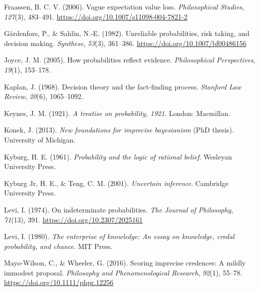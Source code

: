 \documentclass[
  10pt,
  dvipsnames,enabledeprecatedfontcommands]{scrartcl}
\newlength{\cslhangindent}
\newlength{\cslentryspacingunit} %
\newenvironment{CSLReferences}[2] %
 {%
  \setlength{\parindent}{0pt}
  \ifodd #1
  \let\oldpar\par
  \def\par{\hangindent=\cslhangindent\oldpar}
  \fi
  \setlength{\parskip}{#2\cslentryspacingunit}
 }%
 {}
\begin{document}
\begin{CSLReferences}{1}{0}
\leavevmode{}%
Fraassen, B. C. V. (2006). Vague expectation value loss.
\emph{Philosophical Studies}, \emph{127}(3), 483--491.
\url{https://doi.org/10.1007/s11098-004-7821-2}

\leavevmode{}%
Gärdenfors, P., \& Sahlin, N.-E. (1982). Unreliable probabilities, risk
taking, and decision making. \emph{Synthese}, \emph{53}(3), 361--386.
\url{https://doi.org/10.1007/bf00486156}

\leavevmode{}%
Joyce, J. M. (2005). How probabilities reflect evidence.
\emph{Philosophical Perspectives}, \emph{19}(1), 153--178.

\leavevmode{}%
Kaplan, J. (1968). Decision theory and the fact-finding process.
\emph{Stanford Law Review}, \emph{20}(6), 1065--1092.

\leavevmode{}%
Keynes, J. M. (1921). \emph{A treatise on probability, 1921}. London:
Macmillan.

\leavevmode{}%
Konek, J. (2013). \emph{New foundations for imprecise bayesianism} (PhD
thesis). University of Michigan.

\leavevmode{}%
Kyburg, H. E. (1961). \emph{Probability and the logic of rational
belief}. Wesleyan University Press.

\leavevmode{}%
Kyburg Jr, H. E., \& Teng, C. M. (2001). \emph{Uncertain inference}.
Cambridge University Press.

\leavevmode{}%
Levi, I. (1974). On indeterminate probabilities. \emph{The Journal of
Philosophy}, \emph{71}(13), 391. \url{https://doi.org/10.2307/2025161}

\leavevmode{}%
Levi, I. (1980). \emph{The enterprise of knowledge: An essay on
knowledge, credal probability, and chance}. MIT Press.

\leavevmode{}%
Mayo-Wilson, C., \& Wheeler, G. (2016). Scoring imprecise credences: A
mildly immodest proposal. \emph{Philosophy and Phenomenological
Research}, \emph{92}(1), 55--78.
\url{https://doi.org/10.1111/phpr.12256}


\end{CSLReferences}
\end{document}
